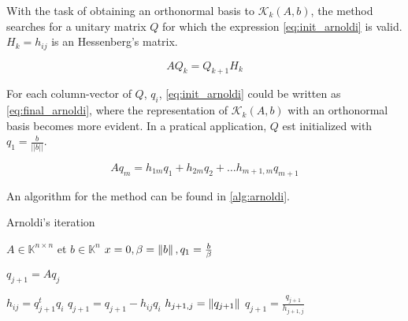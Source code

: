     With the task of obtaining an orthonormal basis to $\mathcal{K}_{k}(A,b)$, the method searches for a unitary matrix $Q$ for which the expression \ref{eq:init_arnoldi} is valid. $H_{k}={h_{ij}}$ is an Hessenberg's matrix.


    \begin{equation} \label{eq:init_arnoldi}
        AQ_{k} = Q_{k+1}H_{k}
    \end{equation} 

    For each column-vector of $Q$, $q_{i}$, \ref{eq:init_arnoldi} could be written as \ref{eq:final_arnoldi}, where the representation of $\mathcal{K}_{k}(A,b)$ with an orthonormal basis becomes more evident. In a pratical application, $Q$ est initialized with $q_{1} = \frac{b}{||b||}$.

    \begin{equation}\label{eq:final_arnoldi}
        Aq_{m} = h_{1m}q_{1} + h_{2m}q_{2} + \dots h_{m+1,m}q_{m+1}
    \end{equation}

    An algorithm for the method can be found in \ref{alg:arnoldi}.

     \begin{algorithm}
    \caption{Arnoldi's iteration}\label{alg:arnoldi}
    \begin{algorithmic}[1]
    \State $A \in \mathbb{K}^{n \times n}$ et $b\in \mathbb{K}^{n}$
    \State $x=0, \beta=\left\lVert b\right\rVert,q_{1}=\frac{b}{\beta}$
    
    \State $q_{j+1} = Aq_{j}$

    \State $h_{ij}= q_{j+1}^{t}q_{i}$
    \State $q_{j+1} = q_{j+1} - h_{ij}q_{i}$
    \EndFor
    \State $h_{j+1,j}=\left\lVert q_{j+1}\right\rVert$
    \State $q_{j+1} = \frac{q_{j+1}}{h_{j+1,j}}$
    \EndFor
    
    \end{algorithmic}
    \end{algorithm}